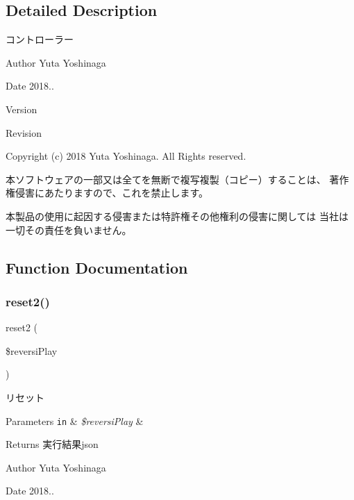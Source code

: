 \subsection{Detailed Description}
コントローラー 

\begin{DoxyAuthor}{Author}
Yuta Yoshinaga 
\end{DoxyAuthor}
\begin{DoxyDate}{Date}
2018.. 
\end{DoxyDate}
\begin{DoxyParagraph}{Version}

\end{DoxyParagraph}
\begin{DoxyParagraph}{Revision}

\end{DoxyParagraph}


Copyright (c) 2018 Yuta Yoshinaga. All Rights reserved.


\begin{DoxyItemize}
\item 本ソフトウェアの一部又は全てを無断で複写複製（コピー）することは、 著作権侵害にあたりますので、これを禁止します。
\item 本製品の使用に起因する侵害または特許権その他権利の侵害に関しては 当社は一切その責任を負いません。 
\end{DoxyItemize}

\subsection{Function Documentation}
\mbox{\label{index_8php_aefe1b9913b0e57099bae4fdc60d30650}} 
\subsubsection{\texorpdfstring{reset2()}{reset2()}}
{\footnotesize\ttfamily reset2 (\begin{DoxyParamCaption}\item[{}]{\$reversi\+Play }\end{DoxyParamCaption})}



リセット 


\begin{DoxyParams}[1]{Parameters}
\mbox{\tt in}  & {\em \$reversi\+Play} & \\
\hline
\end{DoxyParams}
\begin{DoxyReturn}{Returns}
実行結果json 
\end{DoxyReturn}
\begin{DoxyAuthor}{Author}
Yuta Yoshinaga 
\end{DoxyAuthor}
\begin{DoxyDate}{Date}
2018.. 
\end{DoxyDate}


